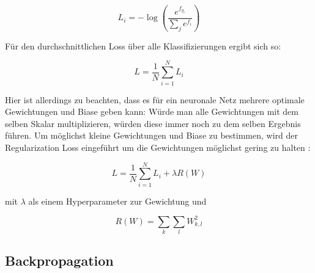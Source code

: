 \begin{equation}
L_i = -\log\left(\dfrac{e^{f_{y_i}}}{\sum_j e^{f_i}}\right)
\end{equation}


Für den durchschnittlichen Loss über alle Klassifizierungen ergibt sich so:

\begin{equation}
L = \dfrac{1}{N}\sum_{i=1}^{N}L_i
\end{equation}

Hier ist allerdings zu beachten, dass es für ein neuronale Netz mehrere optimale Gewichtungen und Biase geben kann: Würde man \bspw alle Gewichtungen mit dem selben Skalar multiplizieren, würden diese immer noch zu dem selben Ergebnis führen. Um möglichst kleine Gewichtungen und Biase zu bestimmen, wird der Regularization Loss eingeführt um die Gewichtungen möglichst gering zu halten \cite{cs231n}:

\begin{equation}
L = \dfrac{1}{N}\sum_{i=1}^{N}L_i + \lambda R(W)
\end{equation}

mit $\lambda$ als einem Hyperparameter zur Gewichtung und

\begin{equation}
R(W) = \sum_k\sum_l W^2_{k,l}
\end{equation}

\subsection{Backpropagation}
\label{ssec:backpropagation}
